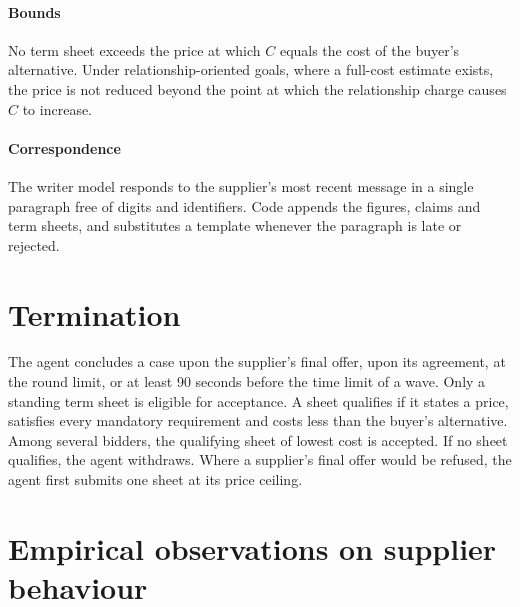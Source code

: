 \documentclass[10pt,a4paper,twocolumn]{article}
\newcommand{\C}{\ensuremath{C}}
\begin{document}
\paragraph{Bounds} No term sheet exceeds the price at which \C{} equals the cost of the buyer's
alternative. Under relationship-oriented goals, where a full-cost estimate exists, the price is not reduced beyond the point at which the relationship charge causes \C{} to increase.

\paragraph{Correspondence} The writer model responds to the supplier's most recent message in a
single paragraph free of digits and identifiers. Code appends the figures, claims and term
sheets, and substitutes a template whenever the paragraph is late or rejected.

\section{Termination}

The agent concludes a case upon the supplier's final offer, upon its agreement, at the round
limit, or at least 90 seconds before the time limit of a wave. Only a standing term sheet is eligible for
acceptance. A sheet qualifies if it states a price, satisfies every mandatory requirement and
costs less than the buyer's alternative. Among several bidders, the qualifying sheet of lowest
cost is accepted. If no sheet qualifies, the agent withdraws. Where a supplier's final offer would be refused, the agent first submits one sheet at its price ceiling.

\section{Empirical observations on supplier behaviour}
\end{document}

